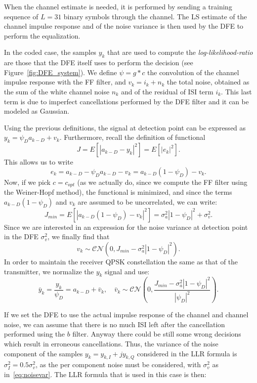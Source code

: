 \documentclass[10pt]{article}
\begin{document}
When the channel estimate is needed, it is performed by sending a training sequence of $L=31$ binary symbols through the channel. The LS estimate of the channel impulse response and of the noise variance is then used by the DFE to perform the equalization.

In the coded case, the samples $y_k$ that are used to compute the \emph{log-likelihood-ratio} are those that the DFE itself uses to perform the decision (see Figure~\ref{fig:DFE_system}). We define $\psi = g * c$ the convolution of the channel impulse response with the FF filter, and $v_k = i_k + n_k$ the total noise, obtained as the sum of the white channel noise $n_k$ and of the residual of ISI term $i_k$. This last term is due to imperfect cancellations performed by the DFE filter and it can be modeled as Gaussian.

Using the previous definitions, the signal at detection point can be expressed as $y_k = \psi_D a_{k-D} + v_k$. Furthermore, recall the definition of functional 
\begin{equation}
 	J = E[|a_{k-D} - y_k|^2] = E[|e_k|^2].
\end{equation}
This allows us to write 
\begin{equation}
	e_k = a_{k-D} - \psi_D a_{k-D} - v_k = a_{k-D} (1 - \psi_D) - v_k.
\end{equation}
Now, if we pick $c = c_{opt}$ (as we actually do, since we compute the FF filter using the Weiner-Hopf method), the functional is minimized, and since the terms $a_{k-D} (1 - \psi_D)$ and $v_k$ are assumed to be uncorrelated, we can write: 
\begin{equation}
	J_{min} = E[|a_{k-D} (1 - \psi_D) - v_k|^2] = \sigma_a^2 |1-\psi_D|^2 + \sigma_v^2.
\end{equation}
Since we are interested in an expression for the noise variance at detection point in the DFE $\sigma_v^2$, we finally find that 
\begin{equation}
	v_k \sim \mathcal{CN}(0, J_{min}-\sigma_a^2|1-\psi_D|^2).
\end{equation}
In order to maintain the receiver QPSK constellation the same as that of the transmitter, we normalize the $y_k$ signal and use:
\begin{equation}
 	 \bar{y}_k = \frac{y_k}{\psi_D} = a_{k-D} + \bar{v}_k, \quad \bar{v}_k \sim \mathcal{CN}\left(0, \frac{J_{min}-\sigma_a^2|1-\psi_D|^2}{|\psi_D|^2}\right).
 	 \label{eq:noisevar}
 \end{equation}

If we set the DFE to use the actual impulse response of the channel and channel noise, we can assume that there is no much ISI left after the cancellation performed using the $b$ filter. Anyway there could be still some wrong decisions which result in erroneous cancellations. Thus, the variance of the noise component of the samples $y_k = y_{k,I} + j y_{k,Q}$ considered in the LLR formula is $\sigma_I^2 = 0.5 \sigma_v^2$, as the per component noise must be considered, with $\sigma_v^2$ as in~\eqref{eq:noisevar}. The LLR formula that is used in this case is then:
\end{document}
